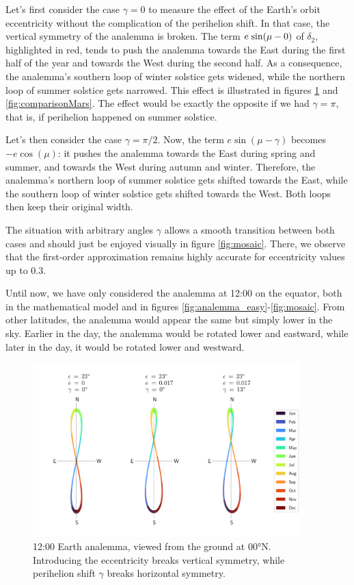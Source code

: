 \documentclass[12pt]{article}
\newcommand{\Sin}{%
  \mathop{\sbox0{$\cos$}\makebox[\wd0][r]{$\sin$}}%
}
\begin{document}
Let's first consider the case $\gamma=0$ to measure the effect of the 
Earth's orbit eccentricity without the complication of the perihelion shift.
In that case, the vertical symmetry of the analemma is broken. The term 
$e\Sin(\mu-0)$ of $\delta_2$, highlighted in red, tends to push the 
analemma towards the East during the first half of the year and towards the 
West during the second half. 
As a consequence, the analemma's southern loop of winter solstice gets widened, 
while the northern loop of summer solstice gets narrowed. 
This effect is illustrated in figures 
\ref{fig:comparisonEarth} and \ref{fig:comparisonMars}.
The effect would be exactly the opposite if we had $\gamma=\pi$,
that is, if perihelion happened on summer solstice.

Let's then consider the case $\gamma=\pi/2$. Now, the term $e\sin(\mu-\gamma)$
becomes $-e\cos(\mu)$: it pushes the analemma towards the East during spring 
and summer, and towards the West during autumn and winter.
Therefore, the analemma's northern loop of summer solstice gets shifted
towards the East, while the southern loop of winter solstice gets shifted
towards the West. Both loops then keep their original width.

The situation with arbitrary angles $\gamma$ allows a smooth transition 
between both cases and should just be enjoyed visually in figure \ref{fig:mosaic}. 
There, we observe that the first-order approximation remains highly accurate 
for eccentricity values up to $0.3$.

Until now, we have only considered the analemma at 12:00 on the equator, both
in the mathematical model and in figures \ref{fig:analemma_easy}-\ref{fig:mosaic}. From other latitudes, the 
analemma would appear the same but simply lower in the sky. Earlier in 
the day, the analemma would be rotated lower and eastward, 
while later in the day, it would be rotated lower and westward.

\begin{figure}
    \centering
    \includegraphics[width=0.92\textwidth]{./comparisonEarth.pdf}
    \caption{
        12:00 Earth analemma, viewed from the ground at 00°N. Introducing the 
        eccentricity breaks vertical symmetry, while perihelion shift 
        $\gamma$ breaks horizontal symmetry.
    }
    \label{fig:comparisonEarth}
\end{figure}
\end{document}
